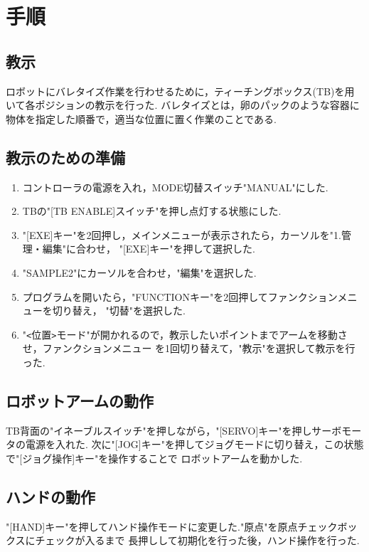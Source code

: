 \documentclass[10pt,a4j]{jsarticle}
\begin{document}
\section{手順}
  \subsection{教示}
  ロボットにバレタイズ作業を行わせるために，ティーチングボックス(TB)を用いて各ポジションの教示を行った.
  バレタイズとは，卵のパックのような容器に物体を指定した順番で，適当な位置に置く作業のことである.

  \subsection{教示のための準備}
  \begin{enumerate}
    \item コントローラの電源を入れ，MODE切替スイッチ"MANUAL"にした. \\
    \item TBの"[TB ENABLE]スイッチ"を押し点灯する状態にした. \\
    \item "[EXE]キー"を2回押し，メインメニューが表示されたら，カーソルを"1.管理・編集"に合わせ，
      "[EXE]キー"を押して選択した. \\
    \item "SAMPLE2"にカーソルを合わせ，"編集"を選択した. \\
    \item プログラムを開いたら，"FUNCTIONキー"を2回押してファンクションメニューを切り替え，
      "切替"を選択した. \\
    \item "\verb|<|位置\verb|>|モード"が開かれるので，教示したいポイントまでアームを移動させ，ファンクションメニュー
      を1回切り替えて，"教示"を選択して教示を行った.
  \end{enumerate}

  \subsection{ロボットアームの動作}
  TB背面の"イネーブルスイッチ"を押しながら，"[SERVO]キー"を押しサーボモータの電源を入れた.
  次に"[JOG]キー"を押してジョグモードに切り替え，この状態で"[ジョグ操作]キー"を操作することで
  ロボットアームを動かした.

  \subsection{ハンドの動作}
  "[HAND]キー"を押してハンド操作モードに変更した."原点"を原点チェックボックスにチェックが入るまで
  長押しして初期化を行った後，ハンド操作を行った.
\end{document}
